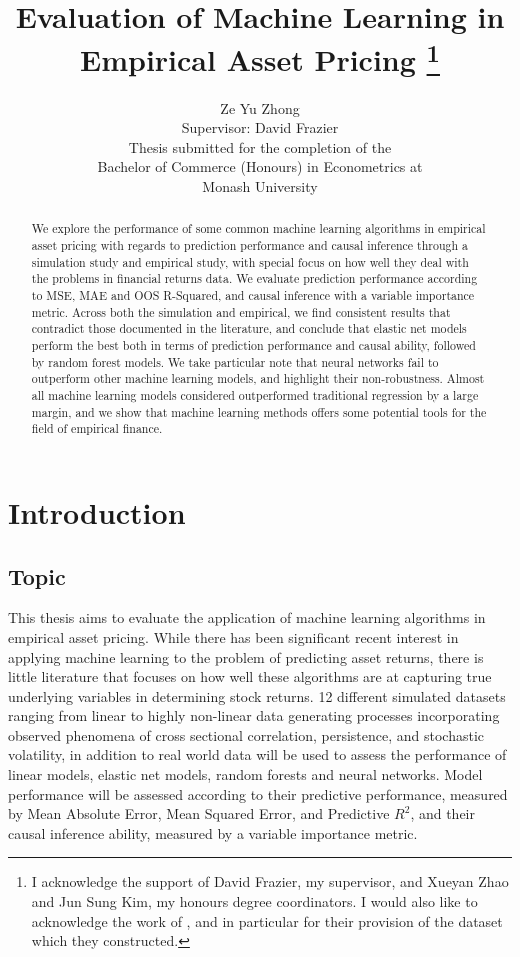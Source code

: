 \documentclass[11pt, a4paper, table]{article}
\title{Evaluation of Machine Learning in Empirical Asset Pricing
\thanks{I acknowledge the support of David Frazier, my supervisor, and Xueyan Zhao and Jun Sung Kim, my honours degree coordinators. I would also like to acknowledge the work of \cite{gu_empirical_2018}, and in particular for their provision of the dataset which they constructed.}
}
\author{Ze Yu Zhong \\
Supervisor: David Frazier \\ 
Thesis submitted for the completion of the \\
Bachelor of Commerce (Honours) in Econometrics at \\
Monash University}
\begin{document}
\maketitle

\begin{abstract}
We explore the performance of some common machine learning algorithms in empirical asset pricing with regards to prediction performance and causal inference through a simulation study and empirical study, with special focus on how well they deal with the problems in financial returns data. We evaluate prediction performance according to MSE, MAE and OOS R-Squared, and causal inference with a variable importance metric. Across both the simulation and empirical, we find consistent results that contradict those documented in the literature, and conclude that elastic net models perform the best both in terms of prediction performance and causal ability, followed by random forest models. We take particular note that neural networks fail to outperform other machine learning models, and highlight their non-robustness. Almost all machine learning models considered outperformed traditional regression by a large margin, and we show that machine learning methods offers some potential tools for the field of empirical finance. 
\end{abstract}

\newpage

\tableofcontents

\newpage


\section{Introduction}

\subsection{Topic}

This thesis aims to evaluate the application of machine learning algorithms in empirical asset pricing. While there has been significant recent interest in applying machine learning to the problem of predicting asset returns, there is little literature that focuses on how well these algorithms are at capturing true underlying variables in determining stock returns. 12 different simulated datasets ranging from linear to highly non-linear data generating processes incorporating observed phenomena of cross sectional correlation, persistence, and stochastic volatility, in addition to real world data will be used to assess the performance of linear models, elastic net models, random forests and neural networks. Model performance will be assessed according to their predictive performance, measured by Mean Absolute Error, Mean Squared Error, and Predictive $R^2$, and their causal inference ability, measured by a variable importance metric.
\end{document}
